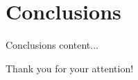 \documentclass[10pt]{beamer}
\begin{document}
\section{Conclusions}

\begin{frame}{Conclusions}
	content...
\end{frame}

\begin{frame}
	 \centering
	{\Large Thank you for your attention!}
	
\end{frame}
\end{document}

